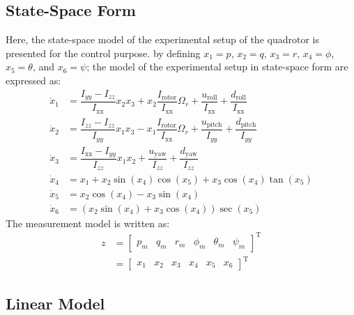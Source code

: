 \documentclass[conference]{IEEEtran}
\begin{document}
\subsection{State-Space Form }
Here, the state-space model of the experimental setup of the quadrotor is presented for the control purpose. by defining $x_1 = p$, $x_2 = q$, $x_3 = r$, $x_4 = \phi$, $x_5 = \theta$, and $x_6 = \psi$; the model of the experimental setup in state-space form are expressed as:
\begin{equation}
	\begin{split}
		\dot x_1 &= \dfrac{I_{yy} - I_{zz}}{I_{\text{xx}}} x_2 x_3 + x_2 \dfrac{I_{\text{rotor}}}{I_{\text{xx}}}\Omega_r + \dfrac{u_{\text{roll}}}{I_{\text{xx}}} + \dfrac{d_{\text{roll}}}{I_{\text{xx}}} \\
		\dot x_2 &= \dfrac{I_{zz} - I_{zz}}{I_{yy}} x_1 x_3 - x_1 \dfrac{I_{\text{rotor}}}{I_{\text{xx}}}\Omega_r + \dfrac{u_{\text{pitch}}}{I_{yy}} + \dfrac{d_{\text{pitch}}}{I_{yy}} \\
		\dot x_3 &= \dfrac{I_{\text{xx}} - I_{yy}}{I_{zz}} x_1 x_2 + \dfrac{u_{\text{yaw}}}{I_{zz}} + \dfrac{d_{\text{yaw}}}{I_{zz}} \\
		\dot x_4 &= x_1 + x_2\sin(x_4)\cos(x_5) + x_3\cos(x_4)\tan(x_5)\\
		\dot x_5 &= x_2\cos(x_4) - x_3\sin(x_4)\\
		\dot x_6 &= (x_2\sin(x_4) + x_3\cos(x_4))\sec(x_5)
	\end{split}
\end{equation}
The measurement model is written as:
\begin{equation}
	\begin{split}
		z &= \begin{bmatrix}
			p_m & q_m & r_m & \phi_m & \theta_m & \psi_m
		\end{bmatrix}^\mathrm{T}
		\\
		& = \begin{bmatrix}
			x_1 & x_2 & x_3 & x_4 & x_5 & x_6
		\end{bmatrix}^\mathrm{T}
	\end{split}
\end{equation}

\subsection{Linear Model}
\end{document}

